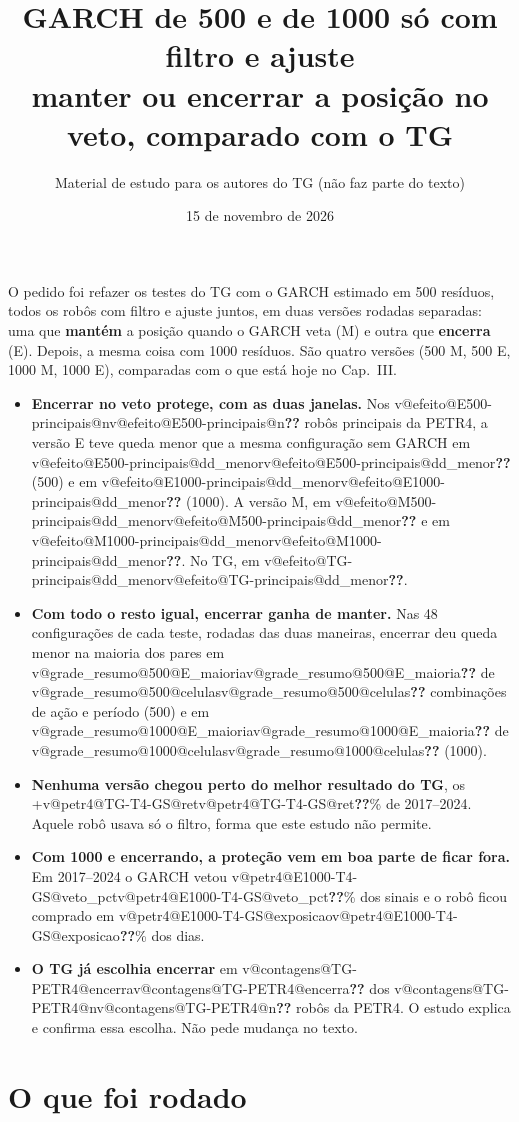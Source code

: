 \documentclass[11pt,a4paper]{article}
\title{\textbf{GARCH de 500 e de 1000 só com filtro e ajuste}\\[2pt]\large manter ou encerrar a posição no veto, comparado com o TG}
\author{Material de estudo para os autores do TG (não faz parte do texto)}
\date{15 de novembro de 2026}
\makeatletter
\newcommand{\V}[3]{\ifcsname v@#1@#2@#3\endcsname\csname v@#1@#2@#3\endcsname\else\textbf{\color{red}??}\fi}
\makeatother
\begin{document}
\maketitle

\begin{ideia}
O pedido foi refazer os testes do TG com o GARCH estimado em 500 resíduos, todos os robôs com filtro e ajuste
juntos, em duas versões rodadas separadas: uma que \textbf{mantém} a posição quando o GARCH veta (M) e outra que
\textbf{encerra} (E). Depois, a mesma coisa com 1000 resíduos. São quatro versões (500 M, 500 E, 1000 M,
1000 E), comparadas com o que está hoje no Cap.~III.
\begin{itemize}\setlength{\itemsep}{1pt}
\item \textbf{Encerrar no veto protege, com as duas janelas.} Nos \V{efeito}{E500-principais}{n} robôs
  principais da PETR4, a versão E teve queda menor que a mesma configuração sem GARCH em
  \V{efeito}{E500-principais}{dd_menor} (500) e em \V{efeito}{E1000-principais}{dd_menor} (1000). A versão M,
  em \V{efeito}{M500-principais}{dd_menor} e em \V{efeito}{M1000-principais}{dd_menor}. No TG, em
  \V{efeito}{TG-principais}{dd_menor}.
\item \textbf{Com todo o resto igual, encerrar ganha de manter.} Nas 48 configurações de cada teste, rodadas das
  duas maneiras, encerrar deu queda menor na maioria dos pares em \V{grade_resumo}{500}{E_maioria} de
  \V{grade_resumo}{500}{celulas} combinações de ação e período (500) e em \V{grade_resumo}{1000}{E_maioria} de
  \V{grade_resumo}{1000}{celulas} (1000).
\item \textbf{Nenhuma versão chegou perto do melhor resultado do TG}, os +\V{petr4}{TG-T4-GS}{ret}\% de
  2017--2024. Aquele robô usava só o filtro, forma que este estudo não permite.
\item \textbf{Com 1000 e encerrando, a proteção vem em boa parte de ficar fora.} Em 2017--2024 o GARCH vetou
  \V{petr4}{E1000-T4-GS}{veto_pct}\% dos sinais e o robô ficou comprado em \V{petr4}{E1000-T4-GS}{exposicao}\%
  dos dias.
\item \textbf{O TG já escolhia encerrar} em \V{contagens}{TG-PETR4}{encerra} dos
  \V{contagens}{TG-PETR4}{n} robôs da PETR4. O estudo explica e confirma essa escolha. Não pede mudança no
  texto.
\end{itemize}
\end{ideia}

\section{O que foi rodado}
\label{sec:montagem}
\end{document}
